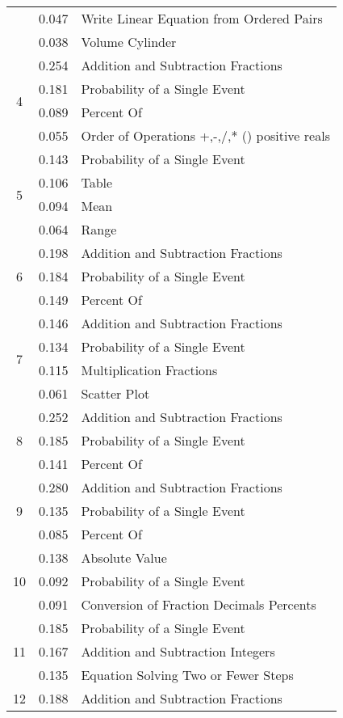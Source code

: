 \begin{longtable}[c]{|c|c|l|}
 & 0.047 & Write Linear Equation from Ordered Pairs \\
 & 0.038 & Volume Cylinder \\
\hline
\multirow{4}{*}{4} & 0.254 & Addition and Subtraction Fractions \\
 & 0.181 & Probability of a Single Event \\
 & 0.089 & Percent Of \\
 & 0.055 & Order of Operations +,-,/,* () positive reals \\
\hline
\multirow{4}{*}{5} & 0.143 & Probability of a Single Event \\
 & 0.106 & Table \\
 & 0.094 & Mean \\
 & 0.064 & Range \\
\hline
\multirow{3}{*}{6} & 0.198 & Addition and Subtraction Fractions \\
 & 0.184 & Probability of a Single Event \\
 & 0.149 & Percent Of \\
\hline
\multirow{4}{*}{7} & 0.146 & Addition and Subtraction Fractions \\
 & 0.134 & Probability of a Single Event \\
 & 0.115 & Multiplication Fractions \\
 & 0.061 & Scatter Plot \\
\hline
\multirow{3}{*}{8} & 0.252 & Addition and Subtraction Fractions \\
 & 0.185 & Probability of a Single Event \\
 & 0.141 & Percent Of \\
\hline
\multirow{3}{*}{9} & 0.280 & Addition and Subtraction Fractions \\
 & 0.135 & Probability of a Single Event \\
 & 0.085 & Percent Of \\
\hline
\multirow{3}{*}{10} & 0.138 & Absolute Value \\
 & 0.092 & Probability of a Single Event \\
 & 0.091 & Conversion of Fraction Decimals Percents \\
\hline
\multirow{3}{*}{11} & 0.185 & Probability of a Single Event \\
 & 0.167 & Addition and Subtraction Integers \\
 & 0.135 & Equation Solving Two or Fewer Steps \\
\hline
\multirow{4}{*}{12} & 0.188 & Addition and Subtraction Fractions \\

\end{longtable}
